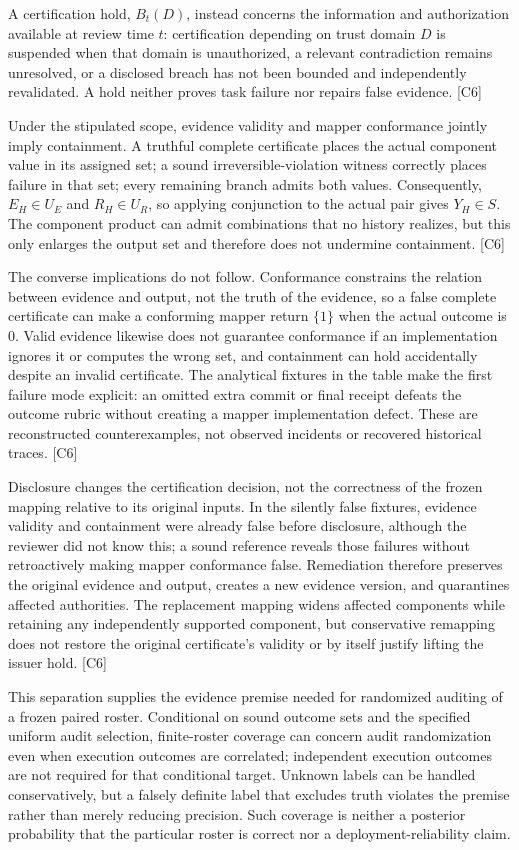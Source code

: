 \documentclass[11pt]{article}
\begin{document}
A certification hold, $B_t(D)$, instead concerns the information and authorization available at review time $t$: certification depending on trust domain $D$ is suspended when that domain is unauthorized, a relevant contradiction remains unresolved, or a disclosed breach has not been bounded and independently revalidated. A hold neither proves task failure nor repairs false evidence. [C6]

Under the stipulated scope, evidence validity and mapper conformance jointly imply containment. A truthful complete certificate places the actual component value in its assigned set; a sound irreversible-violation witness correctly places failure in that set; every remaining branch admits both values. Consequently, $E_H\in U_E$ and $R_H\in U_R$, so applying conjunction to the actual pair gives $Y_H\in S$. The component product can admit combinations that no history realizes, but this only enlarges the output set and therefore does not undermine containment. [C6]

The converse implications do not follow. Conformance constrains the relation between evidence and output, not the truth of the evidence, so a false complete certificate can make a conforming mapper return $\{1\}$ when the actual outcome is $0$. Valid evidence likewise does not guarantee conformance if an implementation ignores it or computes the wrong set, and containment can hold accidentally despite an invalid certificate. The analytical fixtures in the table make the first failure mode explicit: an omitted extra commit or final receipt defeats the outcome rubric without creating a mapper implementation defect. These are reconstructed counterexamples, not observed incidents or recovered historical traces. [C6]

Disclosure changes the certification decision, not the correctness of the frozen mapping relative to its original inputs. In the silently false fixtures, evidence validity and containment were already false before disclosure, although the reviewer did not know this; a sound reference reveals those failures without retroactively making mapper conformance false. Remediation therefore preserves the original evidence and output, creates a new evidence version, and quarantines affected authorities. The replacement mapping widens affected components while retaining any independently supported component, but conservative remapping does not restore the original certificate\textquoteright{}s validity or by itself justify lifting the issuer hold. [C6]

This separation supplies the evidence premise needed for randomized auditing of a frozen paired roster. Conditional on sound outcome sets and the specified uniform audit selection, finite-roster coverage can concern audit randomization even when execution outcomes are correlated; independent execution outcomes are not required for that conditional target. Unknown labels can be handled conservatively, but a falsely definite label that excludes truth violates the premise rather than merely reducing precision. Such coverage is neither a posterior probability that the particular roster is correct nor a deployment-reliability claim.
\end{document}

